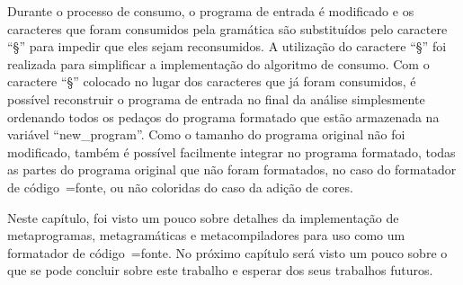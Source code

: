 Durante o processo de consumo,
o programa de entrada é modificado e
os caracteres que foram consumidos pela gramática são substituídos pelo caractere ``§'' para impedir que eles sejam reconsumidos.
A utilização do caractere ``§'' foi realizada para simplificar a implementação do algoritmo de consumo.
Com o caractere ``§'' colocado no lugar dos caracteres que já foram consumidos,
é possível reconstruir o programa de entrada no final da análise simplesmente ordenando todos os pedaços do programa formatado que estão armazenada na variável ``new\_program''.
Como o tamanho do programa original não foi modificado,
também é possível facilmente integrar no programa formatado,
todas as partes do programa original que não foram formatados,
no caso do formatador de código~=fonte,
ou não coloridas do caso da adição de cores.

Neste capítulo,
foi visto um pouco sobre detalhes da implementação de metaprogramas,
metagramáticas e
metacompiladores para uso como um formatador de código~=fonte.
No próximo capítulo será visto um pouco sobre o que se pode concluir sobre este trabalho e
esperar dos seus trabalhos futuros.

